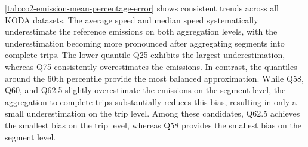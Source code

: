 \autoref{tab:co2-emission-mean-percentage-error} shows consistent trends across all KODA datasets. The average speed and median speed systematically underestimate the reference emissions on both aggregation levels, with the underestimation becoming more pronounced after aggregating segments into complete trips. The lower quantile Q25 exhibits the largest underestimation, whereas Q75 consistently overestimates the emissions. In contrast, the quantiles around the 60th percentile provide the most balanced approximation. While Q58, Q60, and Q62.5 slightly overestimate the emissions on the segment level, the aggregation to complete trips substantially reduces this bias, resulting in only a small underestimation on the trip level. Among these candidates, Q62.5 achieves the smallest bias on the trip level, whereas Q58 provides the smallest bias on the segment level.

